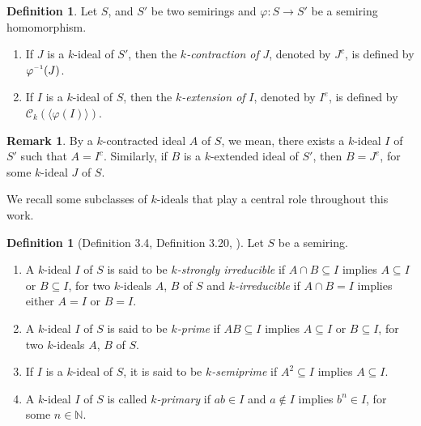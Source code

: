 \documentclass[11pt,leqno]{amsart}
\newcommand{\inv}{^{\raisebox{.2ex}{$\scriptscriptstyle-1$}}}
\theoremstyle{definition}
\newtheorem{definition}[theorem]{Definition}
\newtheorem{remark}[theorem]{Remark}
\numberwithin{equation}{section}
\begin{document}
\begin{definition} 
	Let $S$, and $S'$ be two semirings and $\varphi\colon S\to S'$ be a semiring homomorphism. 
	\begin{enumerate}
		\item If $J$ is a $k$-ideal of $S'$, then the \emph{$k$-contraction of} $J$, denoted by $J^c$, is defined by $\varphi\inv(J)$.
		\item If $I$ is a $k$-ideal of $S$, then the \emph{$k$-extension of} $I$, denoted by $I^e$, is defined by $\mathcal{C}_k(\langle\varphi(I)\rangle)$.
	\end{enumerate}    
\end{definition}

\begin{remark}
	By a $k$-contracted ideal $A$ of $S$, we mean, there exists a $k$-ideal $I$ of $S'$ such that $A=I^c$. Similarly, if $B$ is a $k$-extended ideal of $S'$, then $B=J^e$, for some $k$-ideal $J$ of $S$.
\end{remark}

We recall some subclasses of $k$-ideals that play a central role throughout this work.

\begin{definition}[Definition 3.4, Definition 3.20, \cite{GoswamiDube24}]
Let $S$ be a semiring. 
    \begin{enumerate}
        \item A $k$-ideal $I$ of $S$ is said to be \emph{$k$-strongly irreducible} if $A\cap B \subseteq I$ implies $A\subseteq I$ or $B\subseteq I$, for two $k$-ideals $A$, $B$ of $S$ and \emph{$k$-irreducible} if $A\cap B=I$ implies either $A=I$ or $B=I$.
        
        \item A $k$-ideal $I$ of $S$ is said to be \emph{$k$-prime} if $AB\subseteq I$ implies $A\subseteq I$ or $B\subseteq I$, for two $k$-ideals $A$, $B$ of $S$.
        
        \item If $I$ is a $k$-ideal of $S$, it is said to be \emph{$k$-semiprime} if $A^2\subseteq I$ implies $A\subseteq I$. 
        
        \item A $k$-ideal $I$ of $S$ is called \emph{$k$-primary} if $ab\in I$ and $a\notin I$ implies $b^n\in I$, for some $n\in \mathds{N}$.
    \end{enumerate}
\end{definition}
\end{document}
